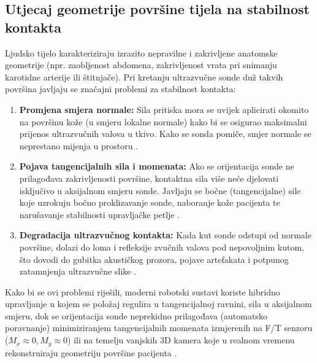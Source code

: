 \subsection{Utjecaj geometrije površine tijela na stabilnost kontakta}
Ljudsko tijelo karakteriziraju izrazito nepravilne i zakrivljene anatomske geometrije (npr. zaobljenost abdomena, zakrivljenost vrata pri snimanju karotidne arterije ili štitnjače). Pri kretanju ultrazvučne sonde duž takvih površina javljaju se značajni problemi za stabilnost kontakta:
\begin{enumerate}
    \item \textbf{Promjena smjera normale:} Sila pritiska mora se uvijek aplicirati okomito na površinu kože (u smjeru lokalne normale) kako bi se osigurao maksimalni prijenos ultrazvučnih valova u tkivo. Kako se sonda pomiče, smjer normale se neprestano mijenja u prostoru \cite{raghavv2022autonomous}.
    \item \textbf{Pojava tangencijalnih sila i momenata:} Ako se orijentacija sonde ne prilagođava zakrivljenosti površine, kontaktna sila više neće djelovati isključivo u aksijalnom smjeru sonde. Javljaju se bočne (tangencijalne) sile koje uzrokuju bočno proklizavanje sonde, naboranje kože pacijenta te narušavanje stabilnosti upravljačke petlje \cite{ieee2023full}.
    \item \textbf{Degradacija ultrazvučnog kontakta:} Kada kut sonde odstupi od normale površine, dolazi do loma i refleksije zvučnih valova pod nepovoljnim kutom, što dovodi do gubitka akustičkog prozora, pojave artefakata i potpunog zatamnjenja ultrazvučne slike \cite{akbari2021robotic}.
\end{enumerate}
Kako bi se ovi problemi riješili, moderni robotski sustavi koriste hibridno upravljanje u kojem se položaj regulira u tangencijalnoj ravnini, sila u aksijalnom smjeru, dok se orijentacija sonde neprekidno prilagođava (automatsko poravnanje) minimiziranjem tangencijalnih momenata izmjerenih na F/T senzoru ($M_x \approx 0, M_y \approx 0$) \cite{conti2010interface} ili na temelju vanjskih 3D kamera koje u realnom vremenu rekonstruiraju geometriju površine pacijenta \cite{ieee2025path}.

